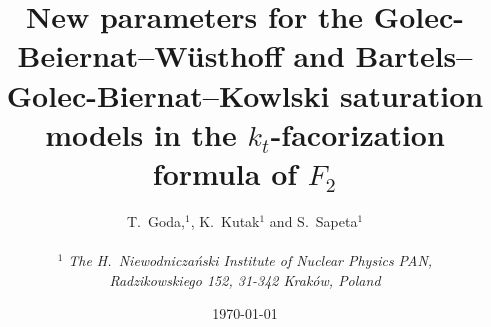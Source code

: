 \documentclass[11pt]{article}
\author{
T.~Goda,$^1$, K.~Kutak$^{1}$ and S.~Sapeta$^1$\\\,\\
$^1$ 
{\small\it The H.\ Niewodnicza\'nski Institute of Nuclear Physics PAN,}\\ 
{\small\it Radzikowskiego 152, 31-342 Krak\'ow, Poland}\\%
}
\title{ New parameters for the Golec-Beiernat--W\"usthoff and Bartels--Golec-Biernat--Kowlski saturation models in the $k_t$-facorization formula of $F_2$}
\date{\today}
\numberwithin{equation}{section}
\numberwithin{table}{section}
\numberwithin{figure}{section}
\newcommand{\comment}[1]{\texttt{\color{red}#1}}
\begin{document}
\maketitle

\vspace{-25em}
\begin{flushright}
\end{flushright}
\vspace{20em}

\begin{abstract}
  
\end{abstract}
%
%
\end{document}
